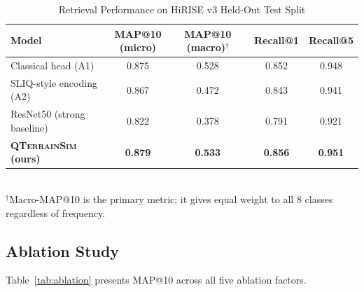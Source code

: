 \documentclass[conference,a4paper]{IEEEtran}
\newcommand{\qts}{\textsc{QTerrainSim}}
\begin{document}
\begin{table}[t]
  \centering
  \caption{Retrieval Performance on HiRISE v3 Held-Out Test Split}
  \label{tab:main}
  \setlength{\tabcolsep}{4pt}
  \begin{tabular}{lcccc}
    \toprule
    Model & \makecell{MAP@10\\(micro)} & \makecell{MAP@10\\(macro)$^\dagger$} & Recall@1 & Recall@5 \\
    \midrule
    Classical head (A1)           & 0.875          & 0.528          & 0.852          & 0.948          \\
    SLIQ-style encoding (A2)      & 0.867          & 0.472          & 0.843          & 0.941          \\
    ResNet50 (strong baseline)    & 0.822          & 0.378          & 0.791          & 0.921          \\
    \textbf{\qts{} (ours)}        & \textbf{0.879} & \textbf{0.533} & \textbf{0.856} & \textbf{0.951} \\
    \bottomrule
  \end{tabular}
  \vspace{2pt}
  \\\footnotesize $^\dagger$Macro-MAP@10 is the primary metric; it gives equal weight to all 8 classes
  regardless of frequency.
\end{table}

\subsection{Ablation Study}
\label{sec:ablation}

Table~\ref{tab:ablation} presents MAP@10 across all five ablation factors.
\end{document}
